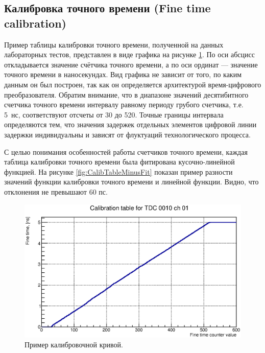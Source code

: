 \subsection{Калибровка точного времени (Fine time calibration)}\label{section:FTcalib}

Пример таблицы калибровки точного времени, полученной на данных лабораторных тестов, представлен в виде графика на рисунке \ref{fig:TypicalCalibTable}. По оси абсцисс откладывается значение счётчика точного времени, а по оси ординат --- значение точного времени в наносекундах. Вид графика не зависит от того, по каким данным он был построен, так как он определяется архитектурой время-цифрового преобразователя. Обратим внимание, что в диапазоне значений десятибитного счетчика точного времени интервалу равному периоду грубого счетчика, т.е. 5~нс, соответствуют отсчеты от 30 до 520. Точные границы интервала определяются тем, что значения задержек отдельных элементов цифровой линии задержки индивидуальны и зависят от флуктуаций технологического процесса.

С целью понимания особенностей работы счетчиков точного времени, каждая таблица калибровки точного времени была фитирована кусочно-линейной функцией. На рисунке \ref{fig:CalibTableMinusFit} показан пример разности значений функции калибровки точного времени и линейной функции. Видно, что отклонения не превышают 60 пс.

\begin{figure}
\includegraphics[width=1.0\textwidth]{pictures/CalTable_0010_01.eps}
\caption{Пример калибровочной кривой.}
\label{fig:TypicalCalibTable}
\end{figure}

